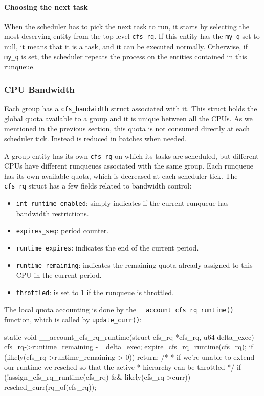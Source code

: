 \paragraph{Choosing the next task}
When the scheduler has to pick the next task to run, it starts by selecting the most deserving entity from the top-level \verb|cfs_rq|. If this entity has the \verb|my_q| set to null, it means that it is a task, and it can be executed normally. Otherwise, if \verb|my_q| is set, the scheduler repeats the process on the entities contained in this runqueue.

\subsubsection{CPU Bandwidth}
Each group has a \verb|cfs_bandwidth| struct associated with it. This struct holds the global quota available to a group and it is unique between all the CPUs. As we mentioned in the previous section, this quota is not consumed directly at each scheduler tick. Instead is reduced in batches when needed.

A group entity has its own \verb|cfs_rq| on which its tasks are scheduled, but different CPUs have different runqueues associated with the same group. Each runqueue has its own available quota, which is decreased at each scheduler tick. The \verb|cfs_rq| struct has a few fields related to bandwidth control:
\begin{itemize}
    \item \verb|int runtime_enabled|: simply indicates if the current runqueue has bandwidth restrictions.
    \item \verb|expires_seq|: period counter.
    \item \verb|runtime_expires|: indicates the end of the current period.
    \item \verb|runtime_remaining|: indicates the remaining quota already assigned to this CPU in the current period.
    \item \verb|throttled|: is set to 1 if the runqueue is throttled.
\end{itemize}

The local quota accounting is done by the \verb|__account_cfs_rq_runtime()| function, which is called by \verb|update_curr()|:
\begin{code}
static void __account_cfs_rq_runtime(struct cfs_rq *cfs_rq, u64 delta_exec)
{
	cfs_rq->runtime_remaining -= delta_exec;
	expire_cfs_rq_runtime(cfs_rq);
	if (likely(cfs_rq->runtime_remaining > 0))
		return;
	/*
	 * if we're unable to extend our runtime we resched so that the active
	 * hierarchy can be throttled
	 */
	if (!assign_cfs_rq_runtime(cfs_rq) && likely(cfs_rq->curr))
		resched_curr(rq_of(cfs_rq));
}
\end{code}

